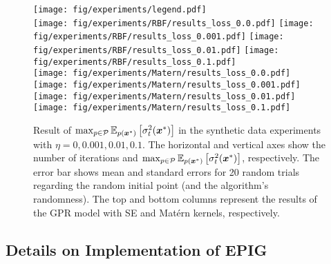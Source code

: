\begin{figure*}[t]
    \centering
    \texttt{[image: fig/experiments/legend.pdf]}\\
    \texttt{[image: fig/experiments/RBF/results\_loss\_0.0.pdf]}
    \texttt{[image: fig/experiments/RBF/results\_loss\_0.001.pdf]}
    \texttt{[image: fig/experiments/RBF/results\_loss\_0.01.pdf]}
    \texttt{[image: fig/experiments/RBF/results\_loss\_0.1.pdf]}\\
    \texttt{[image: fig/experiments/Matern/results\_loss\_0.0.pdf]}
    \texttt{[image: fig/experiments/Matern/results\_loss\_0.001.pdf]}
    \texttt{[image: fig/experiments/Matern/results\_loss\_0.01.pdf]}
    \texttt{[image: fig/experiments/Matern/results\_loss\_0.1.pdf]}
    \caption{
        Result of $\max_{p \in {\cal P}} \mathbb{E}_{p(\boldsymbol{x}^*)} \left[ \sigma_t^2 (\boldsymbol{x}^*) \right]$ in the synthetic data experiments with $\eta=0, 0.001, 0.01, 0.1$.
        The horizontal and vertical axes show the number of iterations and $\max_{p \in {\cal P}} \mathbb{E}_{p(\boldsymbol{x}^*)} \left[ \sigma_t^2 (\boldsymbol{x}^*) \right]$, respectively.
        The error bar shows mean and standard errors for 20 random trials regarding the random initial point (and the algorithm's randomness).
        The top and bottom columns represent the results of the GPR model with SE and Mat\'ern kernels, respectively.
    }
    \label{fig:syn_loss_results}
\end{figure*}


\subsection{Details on Implementation of EPIG}
\label{sec:EPIG}


